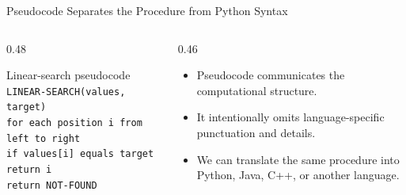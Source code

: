 \documentclass[aspectratio=169,10pt]{beamer}
\begin{document}
\begin{frame}{Pseudocode Separates the Procedure from Python Syntax}
  \begin{columns}[T,onlytextwidth]
    \begin{column}{0.48\textwidth}
      \begin{block}{Linear-search pseudocode}
        \texttt{LINEAR-SEARCH(values, target)}\\
        \hspace*{0.20in}\texttt{for each position i from left to right}\\
        \hspace*{0.40in}\texttt{if values[i] equals target}\\
        \hspace*{0.60in}\texttt{return i}\\
        \hspace*{0.20in}\texttt{return NOT-FOUND}
      \end{block}
    \end{column}
    \begin{column}{0.46\textwidth}
      \begin{itemize}
        \item Pseudocode communicates the computational structure.
        \item It intentionally omits language-specific punctuation and details.
        \item We can translate the same procedure into Python, Java, C++, or another language.
      \end{itemize}
    \end{column}
  \end{columns}
\end{frame}
\end{document}
